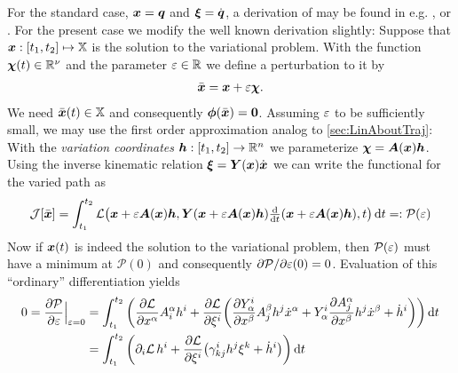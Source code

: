 For the standard case, $\sysCoord = \genCoord$ and $\sysVel = \genCoordd$, a derivation of may be found in e.g. \cite[chap.\,4, §3]{CourantHilbert1}, \cite[ch.\,II]{Lanczos:Variational} or \cite[sec.\,12]{Arnold:MathematicalMethodsOfClassicalMechanics}.
For the present case we modify the well known derivation slightly:
Suppose that $\sysCoord : [t_1, t_2] \mapsto \configSpace$ is the solution to the variational problem.
With the function $\varFkt(t) \in \RealNum^{\numCoord}$ and the parameter $\varParam\in\RealNum$ we define a perturbation to it by
\begin{align}
 \sysCoordB = \sysCoord + \varParam\varFkt.
\end{align}
We need $\sysCoordB(t) \in \configSpace$ and consequently $\geoConstraint(\sysCoordB)=\tuple{0}$.
Assuming $\varParam$ to be sufficiently small, we may use the first order approximation analog to \autoref{sec:LinAboutTraj}:
With the \textit{variation coordinates} $\varCoord : [t_1,t_2] \rightarrow \RealNum^{\dimConfigSpace}$ we parameterize $\varFkt = \kinMat(\sysCoord)\varCoord$.
Using the inverse kinematic relation $\sysVel = \kinBasisMat(\sysCoord)\sysCoordd$ we can write the functional for the varied path as
\begin{align}
 \mathcal{J}[\sysCoordB] = \int_{t_1}^{t_2} \Lagrangian\big(\sysCoord + \varParam\kinMat(\sysCoord)\varCoord, \kinBasisMat(\sysCoord + \varParam\kinMat(\sysCoord)\varCoord) \tdiff{t}(\sysCoord + \varParam\kinMat(\sysCoord)\varCoord), t\big) \, \d t =: \mathcal{P}(\varParam)
\end{align}
Now if $\sysCoord(t)$ is indeed the solution to the variational problem, then $\mathcal{P}(\varParam)$ must have a minimum at $\mathcal{P}(0)$ and consequently $\spdiff[\mathcal{P}]{\varParam}(0) = 0$.
Evaluation of this ``ordinary'' differentiation yields
\begin{align}
 0 = \pdiff[\mathcal{P}]{\varParam} \Big|_{\varParam=0} &= \int_{t_1}^{t_2} \bigg( \pdiff[\Lagrangian]{\sysCoordCoeff{\GidxI}} \kinMatCoeff{\GidxI}{\LidxI} \varCoordCoeff{\LidxI} + \pdiff[\Lagrangian]{\sysVelCoeff{\LidxI}} \bigg( \pdiff[\kinBasisMatCoeff{\LidxI}{\GidxI}]{\sysCoordCoeff{\GidxII}} \kinMatCoeff{\GidxII}{\LidxII} \varCoordCoeff{\LidxII} \sysCoordCoeffd{\GidxI} + \kinBasisMatCoeff{\LidxI}{\GidxI} \pdiff[\kinMatCoeff{\GidxI}{\LidxII}]{\sysCoordCoeff{\GidxII}} \varCoordCoeff{\LidxII} \sysCoordCoeffd{\GidxII} + \varCoordCoeffd{\LidxI}\bigg) \bigg) \, \d t
\nonumber\\
 &= \int_{t_1}^{t_2} \bigg( \dirDiff{\LidxI}\Lagrangian \, \varCoordCoeff{\LidxI} + \pdiff[\Lagrangian]{\sysVelCoeff{\LidxI}} \big( \BoltzSym{\LidxI}{\LidxIII}{\LidxII} \varCoordCoeff{\LidxII} \sysVelCoeff{\LidxIII} + \varCoordCoeffd{\LidxI} \big) \bigg) \, \d t
\end{align}
